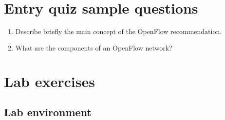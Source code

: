 \documentclass[a4paper]{article}
\begin{document}
\appendix

\section{Entry quiz sample questions}

\begin{enumerate}
    \item Describe briefly the main concept of the OpenFlow recommendation.
    \item What are the components of an OpenFlow network?
\end{enumerate}

\section{Lab exercises}

\subsection{Lab environment}
\end{document}
